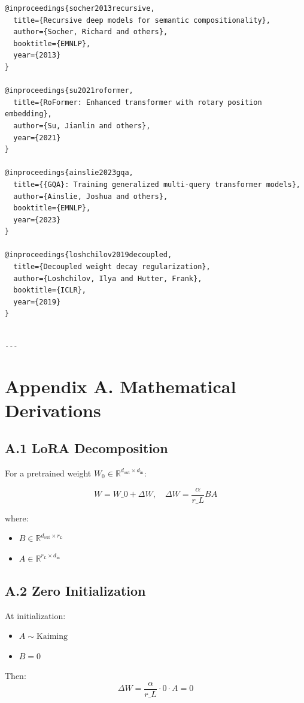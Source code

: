 \begin{lstlisting}
@inproceedings{socher2013recursive,
  title={Recursive deep models for semantic compositionality},
  author={Socher, Richard and others},
  booktitle={EMNLP},
  year={2013}
}

@inproceedings{su2021roformer,
  title={RoFormer: Enhanced transformer with rotary position embedding},
  author={Su, Jianlin and others},
  year={2021}
}

@inproceedings{ainslie2023gqa,
  title={{GQA}: Training generalized multi-query transformer models},
  author={Ainslie, Joshua and others},
  booktitle={EMNLP},
  year={2023}
}

@inproceedings{loshchilov2019decoupled,
  title={Decoupled weight decay regularization},
  author={Loshchilov, Ilya and Hutter, Frank},
  booktitle={ICLR},
  year={2019}
}
\end{lstlisting}
\begin{lstlisting}

---
\end{lstlisting}

\section{Appendix A. Mathematical Derivations}

\subsection{A.1 LoRA Decomposition}

For a pretrained weight $W_0 \in \mathbb{R}^{d_\text{out} \times d_\text{in}}$:

\[
W = W\_0 + \Delta W, \quad \Delta W = \frac{\alpha}{r\_L} B A
\tag{A.1}
\]

where:
\begin{itemize}
\item $B \in \mathbb{R}^{d_\text{out} \times r_L}$
\item $A \in \mathbb{R}^{r_L \times d_\text{in}}$

\end{itemize}
\subsection{A.2 Zero Initialization}

At initialization:
\begin{itemize}
\item $A \sim \text{Kaiming}$
\item $B = 0$

\end{itemize}
Then:
\[
\Delta W = \frac{\alpha}{r\_L} \cdot 0 \cdot A = 0
\tag{A.2}
\]

